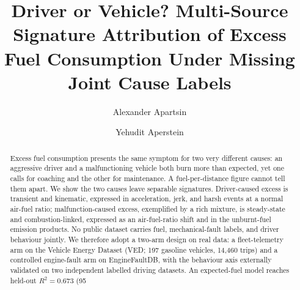 \documentclass[preprint,11pt]{elsarticle}
\begin{document}
\begin{frontmatter}
\title{Driver or Vehicle? Multi-Source Signature Attribution of Excess Fuel Consumption Under Missing Joint Cause Labels}
\author[hit]{Alexander Apartsin}
\author[afeka]{Yehudit Aperstein}
\begin{abstract}
Excess fuel consumption presents the same symptom for two very different causes: an aggressive driver and a malfunctioning vehicle both burn more than expected, yet one calls for coaching and the other for maintenance. A fuel-per-distance figure cannot tell them apart. We show the two causes leave separable signatures. Driver-caused excess is transient and kinematic, expressed in acceleration, jerk, and harsh events at a normal air-fuel ratio; malfunction-caused excess, exemplified by a rich mixture, is steady-state and combustion-linked, expressed as an air-fuel-ratio shift and in the unburnt-fuel emission products. No public dataset carries fuel, mechanical-fault labels, and driver behaviour jointly. We therefore adopt a two-arm design on real data: a fleet-telemetry arm on the Vehicle Energy Dataset (VED; 197 gasoline vehicles, 14,460 trips) and a controlled engine-fault arm on EngineFaultDB, with the behaviour axis externally validated on two independent labelled driving datasets. An expected-fuel model reaches held-out \(R^2 = 0.673\) (95%
\end{abstract}
\end{frontmatter}
\end{document}
